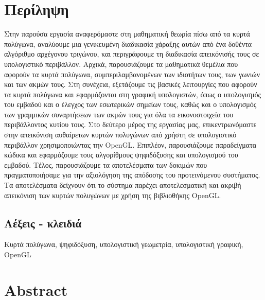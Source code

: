 \chapter*{Περίληψη}

Στην παρούσα εργασία αναφερόμαστε στη μαθηματική θεωρία πίσω από τα κυρτά πολύγωνα, αναλύουμε μια γενικευμένη διαδικασία χάραξης αυτών από ένα δοθέντα αλγόριθμο αρχέγονου τριγώνου, και περιγράφουμε τη διαδικασία απεικόνισής τους σε υπολογιστικό περιβάλλον. Αρχικά, παρουσιάζουμε τα μαθηματικά θεμέλια που αφορούν τα κυρτά πολύγωνα, συμπεριλαμβανομένων των ιδιοτήτων τους, των γωνιών και των ακμών τους. Στη συνέχεια, εξετάζουμε τις βασικές λειτουργίες που αφορούν τα κυρτά πολύγωνα και εφαρμόζονται στη γραφική υπολογιστών, όπως ο υπολογισμός του εμβαδού και ο έλεγχος των εσωτερικών σημείων τους, καθώς και ο υπολογισμός των γραμμικών συναρτήσεων των ακμών τους για όλα τα εικονοστοιχεία του περιβάλλοντος κυτίου τους. Στο δεύτερο μέρος της εργασίας μας, επικεντρωνόμαστε στην απεικόνιση αυθαίρετων κυρτών πολυγώνων από χρήστη σε υπολογιστικό περιβάλλον χρησιμοποιώντας την \textlatin{OpenGL}. Επιπλέον, παρουσιάζουμε παραδείγματα κώδικα και εφαρμόζουμε τους αλγορίθμους ψηφιδόξυσης και υπολογισμού του εμβαδού. Τέλος, παρουσιάζουμε τα αποτελέσματα των δοκιμών που πραγματοποιήσαμε για την αξιολόγηση της απόδοσης του προτεινόμενου συστήματος. Τα αποτελέσματα δείχνουν ότι το σύστημα παρέχει αποτελεσματική και ακριβή απεικόνιση των κυρτών πολυγώνων με χρήση της βιβλιοθήκης \textlatin{OpenGL}.

\vspace{1.5em}

\section*{Λέξεις - κλειδιά}
Κυρτά πολύγωνα, ψηφιδόξυση, υπολογιστική γεωμετρία, υπολογιστική γραφική, \textlatin{OpenGL}

\newpage

\chapter*{\textlatin{Abstract}}

